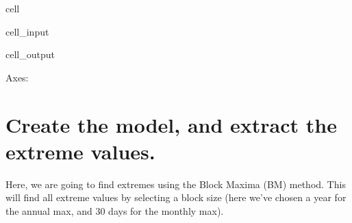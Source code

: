 \documentclass[letterpaper,10pt,english]{jupyterBook}
\begin{document}
\begin{sphinxuseclass}{cell}
\begin{sphinxVerbatimInput}
\begin{sphinxuseclass}{cell_input}
\begin{sphinxVerbatim}[commandchars=\\\{\}]
  
  

    

 
\end{sphinxVerbatim}

\end{sphinxuseclass}\end{sphinxVerbatimInput}
\begin{sphinxVerbatimOutput}

\begin{sphinxuseclass}{cell_output}
\begin{sphinxVerbatim}[commandchars=\\\{\}]
\PYGZlt{}Axes: \PYGZgt{}
\end{sphinxVerbatim}

\noindent{}

\end{sphinxuseclass}\end{sphinxVerbatimOutput}

\end{sphinxuseclass}

\chapter{Create the model, and extract the extreme values.}
\label{\detokenize{notebooks/regional_and_local/SL_Extremes_annual:create-the-model-and-extract-the-extreme-values}}
\sphinxAtStartPar
Here, we are going to find extremes using the Block Maxima (BM) method. This will find all extreme values by selecting a block size (here we’ve chosen a year for the annual max, and 30 days for the monthly max).
\end{document}
